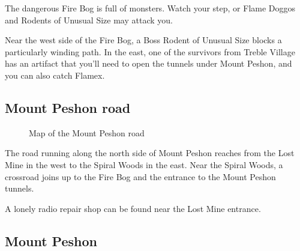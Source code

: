 \documentclass[10pt,twocolumn]{memoir}
\begin{document}
The dangerous Fire Bog is full of monsters. Watch your step, or Flame Doggos and
Rodents of Unusual Size may attack you.

Near  the west  side of  the Fire  Bog,  a Boss  Rodent of  Unusual Size  blocks
a  particularly winding  path. In  the east,  one of  the survivors  from Treble
Village has an artifact that you'll need to open the tunnels under Mount Peshon,
and you can also catch Flamex.

\subsection{Mount Peshon road}

\begin{figure}[ht]
  \begin{center}
  \end{center}
  \caption{Map of the Mount Peshon road}
\end{figure}

The road running along the north side of Mount Peshon reaches from the Lost Mine
in the west to the Spiral Woods in  the east. Near the Spiral Woods, a crossroad
joins up to the Fire Bog and the entrance to the Mount Peshon tunnels.

A lonely radio repair shop can be found near the Lost Mine entrance.

\subsection{Mount Peshon}
\end{document}
